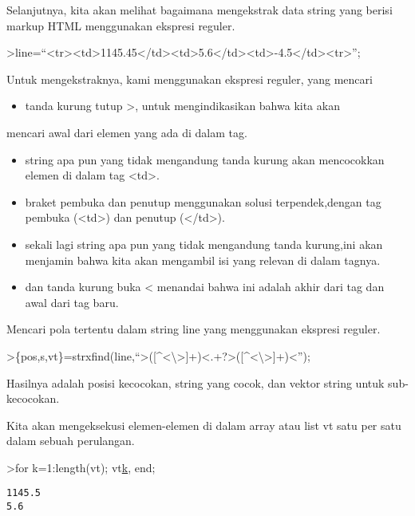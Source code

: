 \documentclass[
]{book}
\providecommand{\tightlist}{%
  \setlength{\itemsep}{0pt}\setlength{\parskip}{0pt}}
\begin{document}
Selanjutnya, kita akan melihat bagaimana mengekstrak data string yang berisi markup HTML menggunakan ekspresi reguler.

\textgreater line=``\textless tr\textgreater\textless td\textgreater1145.45\textless/td\textgreater\textless td\textgreater5.6\textless/td\textgreater\textless td\textgreater-4.5\textless/td\textgreater\textless tr\textgreater{}'';

Untuk mengekstraknya, kami menggunakan ekspresi reguler, yang mencari

\begin{itemize}
\tightlist
\item
  tanda kurung tutup \textgreater, untuk mengindikasikan bahwa kita akan
\end{itemize}

mencari awal dari elemen yang ada di dalam tag.

\begin{itemize}
\item
  string apa pun yang tidak mengandung tanda kurung akan mencocokkan elemen di dalam tag \textless td\textgreater.
\item
  braket pembuka dan penutup menggunakan solusi terpendek,dengan tag pembuka (\textless td\textgreater) dan penutup (\textless/td\textgreater).
\item
  sekali lagi string apa pun yang tidak mengandung tanda kurung,ini akan menjamin bahwa kita akan mengambil isi yang relevan di dalam tagnya.
\item
  dan tanda kurung buka \textless{} menandai bahwa ini adalah akhir dari tag dan awal dari tag baru.
\end{itemize}

Mencari pola tertentu dalam string line yang menggunakan ekspresi reguler.

\textgreater\{pos,s,vt\}=strxfind(line,``\textgreater({[}\^{}\textless\textbackslash\textgreater{]}+)\textless.+?\textgreater({[}\^{}\textless\textbackslash\textgreater{]}+)\textless{}'');

Hasilnya adalah posisi kecocokan, string yang cocok, dan vektor string untuk sub-kecocokan.

Kita akan mengeksekusi elemen-elemen di dalam array atau list vt satu per satu dalam sebuah perulangan.

\textgreater for k=1:length(vt); vt\href{}{k}, end;

\begin{verbatim}
1145.5
5.6
\end{verbatim}
\end{document}
